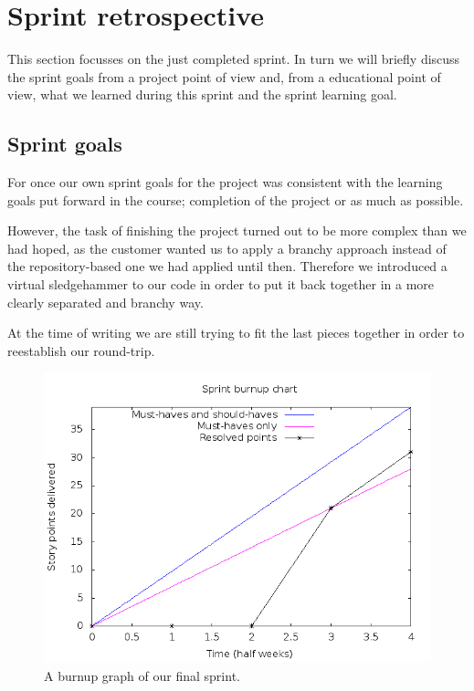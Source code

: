\documentclass[a4paper,11pt]{article}
\begin{document}
\section{Sprint retrospective}
\label{sec:sprint_retrospective}
This section focusses on the just completed sprint. In turn we will briefly
discuss the sprint goals from a project point of view and, from a educational
point of view, what we learned during this sprint and the sprint learning goal.

\subsection{Sprint goals}
\label{sec:sprint_goals}

For once our own sprint goals for the project was consistent with the learning
goals put forward in the course; completion of the project or as much as
possible. 

However, the task of finishing the project turned out to be more
complex than we had hoped, as the customer wanted us to apply a branchy approach
instead of the repository-based one we had applied until then. Therefore we
introduced a virtual sledgehammer to our code in order to put it back together
in a more clearly separated and branchy way.

At the time of writing we are still trying to fit the last pieces together in
order to reestablish our round-trip.

\begin{figure}[!ht]
	\centering
	\includegraphics[width=12cm]{img/burnup.png}
	\caption{A burnup graph of our final sprint.}
	\label{fig:burnup}
\end{figure}
\end{document}
